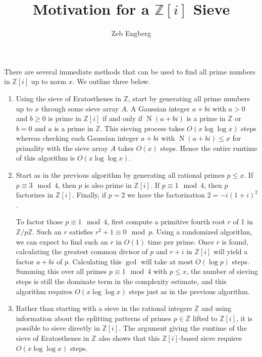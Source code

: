 \documentclass{article}
\begin{document}
\title{Motivation for a $\mathbb{Z}[i]$ Sieve}
\date{}
\author{Zeb Engberg}
\maketitle


There are several immediate methods that can be used to find all prime numbers in $\mathbb{Z}[i]$ up to norm $x$. We outline three below.
\begin{enumerate}
\item Using the sieve of Eratosthenes in $\mathbb{Z}$, start by generating all prime numbers up to $x$ through some sieve array $A$. A Gaussian integer $a + bi$ with $a > 0$ and $b\ge 0$ is prime in $\mathbb{Z}[i]$ if and only if $\operatorname N(a + bi)$ is a prime in $\mathbb{Z}$ or $b = 0$ and $a$ is a prime in $\mathbb{Z}$. This sieving process takes $O(x \log \log x)$ steps whereas checking each Gaussian integer $a + bi$ with $\operatorname N(a + bi) \le x$ for primality with the sieve array $A$ takes $O(x)$ steps. Hence the entire runtime of this algorithm is $O(x \log \log x)$.

\item Start as in the previous algorithm by generating all rational primes $p\le x$. If $p \equiv 3 \mod 4$, then $p$ is also prime in $\mathbb{Z}[i]$. If $p \equiv 1 \mod 4$, then $p$ factorizes in $\mathbb{Z}[i]$. Finally, if $p = 2$ we have the factorization $2 = - i (1 + i) ^ 2$.

To factor those $p \equiv 1 \mod 4$, first compute a primitive fourth root $r$ of 1 in $\mathbb{Z}/p\mathbb{Z}$. Such an $r$ satisfies $r ^ 2 + 1 \equiv 0 \mod p$. Using a randomized algorithm, we can expect to find such an $r$ in $O(1)$ time per prime. Once $r$ is found, calculating the greatest common divisor of $p$ and $r + i$ in $\mathbb{Z}[i]$ will yield a factor $a + bi$ of $p$. Calculating this $\gcd$ will take at most $O(\log p)$ steps. Summing this over all primes $p\equiv 1 \mod 4$ with $p\le x$, the number of sieving steps is still the dominate term in the complexity estimate, and this algorithm requires $O(x \log \log x)$ steps just as in the previous algorithm.

\item Rather than starting with a sieve in the rational integers $\mathbb{Z}$ and using information about the splitting patterns of primes $p\in\mathbb{Z}$ lifted to $\mathbb{Z}[i]$, it is possible to sieve directly in $\mathbb{Z}[i]$. The argument giving the runtime of the sieve of Eratosthenes in $\mathbb{Z}$ also shows that this $\mathbb{Z}[i]$-based sieve requires $O(x \log \log x)$ steps.
\end{enumerate}
\end{document}
